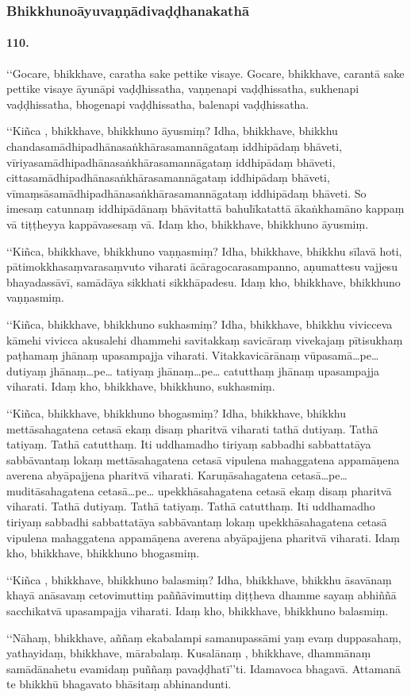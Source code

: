 \subsubsection{Bhikkhunoāyuvaṇṇādivaḍḍhanakathā}

\paragraph{110.} ‘‘Gocare, bhikkhave, caratha sake pettike visaye. Gocare, bhikkhave, carantā sake pettike visaye āyunāpi vaḍḍhissatha, vaṇṇenapi vaḍḍhissatha, sukhenapi vaḍḍhissatha, bhogenapi vaḍḍhissatha, balenapi vaḍḍhissatha.

‘‘Kiñca , bhikkhave, bhikkhuno āyusmiṃ? Idha, bhikkhave, bhikkhu chandasamādhipadhānasaṅkhārasamannāgataṃ iddhipādaṃ bhāveti, vīriyasamādhipadhānasaṅkhārasamannāgataṃ iddhipādaṃ bhāveti, cittasamādhipadhānasaṅkhārasamannāgataṃ iddhipādaṃ bhāveti, vīmaṃsāsamādhipadhānasaṅkhārasamannāgataṃ iddhipādaṃ bhāveti. So imesaṃ catunnaṃ iddhipādānaṃ bhāvitattā bahulīkatattā ākaṅkhamāno kappaṃ vā tiṭṭheyya kappāvasesaṃ vā. Idaṃ kho, bhikkhave, bhikkhuno āyusmiṃ.

‘‘Kiñca, bhikkhave, bhikkhuno vaṇṇasmiṃ? Idha, bhikkhave, bhikkhu sīlavā hoti, pātimokkhasaṃvarasaṃvuto viharati ācāragocarasampanno, aṇumattesu vajjesu bhayadassāvī, samādāya sikkhati sikkhāpadesu. Idaṃ kho, bhikkhave, bhikkhuno vaṇṇasmiṃ.

‘‘Kiñca, bhikkhave, bhikkhuno sukhasmiṃ? Idha, bhikkhave, bhikkhu vivicceva kāmehi vivicca akusalehi dhammehi savitakkaṃ savicāraṃ vivekajaṃ pītisukhaṃ paṭhamaṃ jhānaṃ upasampajja viharati. Vitakkavicārānaṃ vūpasamā…pe… dutiyaṃ jhānaṃ…pe… tatiyaṃ jhānaṃ…pe… catutthaṃ jhānaṃ upasampajja viharati. Idaṃ kho, bhikkhave, bhikkhuno, sukhasmiṃ.

‘‘Kiñca, bhikkhave, bhikkhuno bhogasmiṃ? Idha, bhikkhave, bhikkhu mettāsahagatena cetasā ekaṃ disaṃ pharitvā viharati tathā dutiyaṃ. Tathā tatiyaṃ. Tathā catutthaṃ. Iti uddhamadho tiriyaṃ sabbadhi sabbattatāya sabbāvantaṃ lokaṃ mettāsahagatena cetasā vipulena mahaggatena appamāṇena averena abyāpajjena pharitvā viharati. Karuṇāsahagatena cetasā…pe… muditāsahagatena cetasā…pe… upekkhāsahagatena cetasā ekaṃ disaṃ pharitvā viharati. Tathā dutiyaṃ. Tathā tatiyaṃ. Tathā catutthaṃ. Iti uddhamadho tiriyaṃ sabbadhi sabbattatāya sabbāvantaṃ lokaṃ upekkhāsahagatena cetasā vipulena mahaggatena appamāṇena averena abyāpajjena pharitvā viharati. Idaṃ kho, bhikkhave, bhikkhuno bhogasmiṃ.

‘‘Kiñca , bhikkhave, bhikkhuno balasmiṃ? Idha, bhikkhave, bhikkhu āsavānaṃ khayā anāsavaṃ cetovimuttiṃ paññāvimuttiṃ diṭṭheva dhamme sayaṃ abhiññā sacchikatvā upasampajja viharati. Idaṃ kho, bhikkhave, bhikkhuno balasmiṃ.

‘‘Nāhaṃ, bhikkhave, aññaṃ ekabalampi samanupassāmi yaṃ evaṃ duppasahaṃ, yathayidaṃ, bhikkhave, mārabalaṃ. Kusalānaṃ , bhikkhave, dhammānaṃ samādānahetu evamidaṃ puññaṃ pavaḍḍhatī’’ti. Idamavoca bhagavā. Attamanā te bhikkhū bhagavato bhāsitaṃ abhinandunti.

